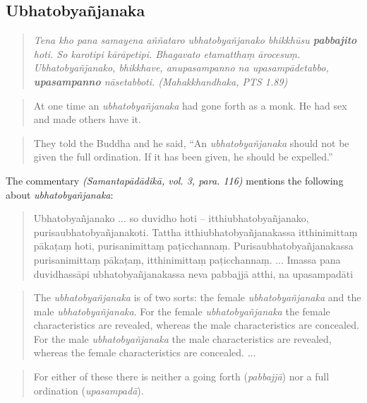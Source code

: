 \subsection{Ubhatob­yañ­janaka}

\begin{quote}
{\em Tena kho pana samayena aññataro ubhatobyañjanako bhikkhūsu \textbf{pabbajito} hoti. So karotipi kārāpetipi. Bhagavato etamatthaṃ ārocesuṃ. Ubhatobyañjanako, bhikkhave, anupasampanno na upasampādetabbo, \textbf{upasampanno} nāsetabboti. (Mahakkhandhaka, PTS 1.89)}
\end{quote}

\medskip

\begin{quote}
At one time an {\em ubhatob­yañ­janaka} had gone forth as a monk. He had sex and made others have it.
\end{quote}
\begin{quote}
They told the Buddha and he said, “An {\em ubhatob­yañ­janaka} should not be given the full ordination. If it has been given, he should be expelled.”
\end{quote}

The commentary {\em (Samantapādādikā, vol. 3, para. 116)} mentions the following about {\em ubhatob­yañ­janaka}:

\begin{quote}
Ubhatobyañjanako ... so duvidho hoti – itthiubhatobyañjanako, purisaubhatobyañjanakoti. Tattha itthiubhatobyañjanakassa itthinimittaṃ pākaṭaṃ hoti, purisanimittaṃ paṭicchannaṃ. Purisaubhatobyañjanakassa purisanimittaṃ pākaṭaṃ, itthinimittaṃ paṭicchannaṃ. ... Imassa pana duvidhassāpi ubhatobyañjanakassa neva pabbajjā atthi, na upasampadāti
\end{quote}

\medskip

\begin{quote}
The {\em ubhatob­yañ­janaka} is of two sorts: the female {\em ubhatob­yañ­janaka} and the male {\em ubhatob­yañ­janaka}. For the female {\em ubhatob­yañ­janaka} the female characteristics are revealed, whereas the male characteristics are concealed. For the male {\em ubhatob­yañ­janaka} the male characteristics are revealed, whereas the female characteristics are concealed. ... 
\end{quote}
\begin{quote}
For either of these there is neither a going forth ({\em pabbajjā}) nor a full ordination ({\em upasampadā}).
\end{quote}

